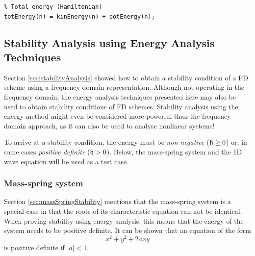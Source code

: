 {{\begin{lstlisting}
% Total energy (Hamiltonian)
totEnergy(n) = kinEnergy(n) + potEnergy(n);
\end{lstlisting}


\subsection{Stability Analysis using Energy Analysis Techniques}
Section \ref{sec:stabilityAnalysis} showed how to obtain a stability condition of a FD scheme using a frequency-domain representation. Although not operating in the frequency domain, the energy analysis techniques presented here may also be used to obtain stability conditions of FD schemes. Stability analysis using the energy method might even be considered more powerful than the frequency domain approach, as it can also be used to analyse nonlinear systems!

To arrive at a stability condition, the energy must be \textit{non-negative} ($\mathfrak{h} \geq 0$) or, in some cases \textit{positive definite} ($\mathfrak{h} > 0$). Below, the mass-spring system and the 1D wave equation will be used as a test case.

\subsubsection{Mass-spring system}
Section \ref{sec:massSpringStability} mentions that the mass-spring system is a special case in that the roots of its characteristic equation can not be identical. When proving stability using energy analysis, this means that the energy of the system needs to be positive definite. It can be shown that an equation of the form 
\begin{equation}\label{eq:quadraticForm}
    x^2 + y^2  + 2axy
\end{equation} 
is positive definite if $|a| < 1$.%

}}
